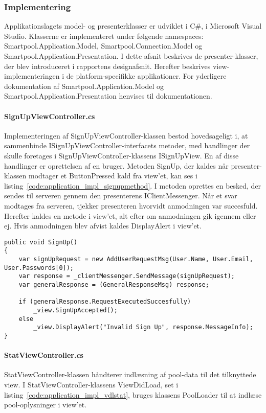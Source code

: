 \subsubsection{Implementering}
Applikationslagets model- og presenterklasser er udviklet i C\#, i Microsoft Visual Studio. Klasserne er implementeret under følgende namespaces: Smartpool.Application.Model, Smartpool.Connection.Model og Smartpool.Application.Presentation. I dette afsnit beskrives de presenter-klasser, der blev introduceret i rapportens designafsnit. Herefter beskrives view-implementeringen i de platform-specifikke applikationer. For yderligere dokumentation af Smartpool.Application.Model og Smartpool.Application.Presentation henvises til dokumentationen.

\paragraph{SignUpViewController.cs}
Implementeringen af SignUpViewController-klassen bestod hovedsageligt i, at sammenbinde ISignUpViewController-interfacets metoder, med handlinger der skulle foretages i SignUpViewController-klassens ISignUpView. En af disse handlinger er oprettelsen af en bruger. Metoden SignUp, der kaldes når presenter-klassen modtager et ButtonPressed kald fra view'et, kan ses i listing~\ref{code:application_impl_signupmethod}. I metoden oprettes en besked, der sendes til serveren gennem den presenterens IClientMessenger. Når et svar modtages fra serveren, tjekker presenteren hvorvidt anmodningen var succesfuld. Herefter kaldes en metode i view'et, alt efter om anmodningen gik igennem eller ej. Hvis anmodningen blev afvist kaldes DisplayAlert i view'et.

\begin{lstlisting}[caption={SignUp()},label={code:application_impl_signupmethod}]
public void SignUp()
{
	var signUpRequest = new AddUserRequestMsg(User.Name, User.Email, User.Passwords[0]);
	var response = _clientMessenger.SendMessage(signUpRequest);
	var generalResponse = (GeneralResponseMsg) response;

	if (generalResponse.RequestExecutedSuccesfully)
		_view.SignUpAccepted();
	else
		_view.DisplayAlert("Invalid Sign Up", response.MessageInfo);
}
\end{lstlisting}

\paragraph{StatViewController.cs}
StatViewController-klassen håndterer indlæsning af pool-data til det tilknyttede view. I StatViewController-klassens ViewDidLoad, set i listing~\ref{code:application_impl_vdlstat}, bruges klassens PoolLoader til at indlæse pool-oplysninger i view'et.

